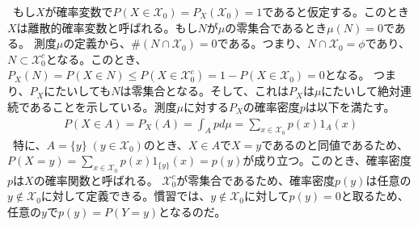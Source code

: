 \documentclass[a4j,12pt]{jarticle}
\begin{document}
\ もし$X$が確率変数で$P(X \in \mathcal{X}_{0}) = P_{X}(\mathcal{X}_{0}) = 1$であると仮定する。このとき$X$は離散的確率変数と呼ばれる。もし$N$が$\mu$の零集合であるとき$\mu(N) = 0$である。
測度$\mu$の定義から、$\#(N \cap \mathcal{X}_{0}) = 0$である。つまり、$N \cap \mathcal{X}_{0} = \phi$であり、$N \subset \mathcal{X}_{0}^{c}$となる。このとき、$P_{X}(N) = P(X \in N) \leq P(X \in \mathcal{X}_{0}^{c}) = 1- P(X \in \mathcal{X}_{0})=0$となる。
つまり、$P_{X}$にたいしても$N$は零集合となる。そして、これは$P_{X}$は$\mu$にたいして絶対連続であることを示している。測度$\mu$に対する$P_{X}$の確率密度$p$は以下を満たす。
\begin{align*}
P(X \in A) = P_{X}(A) = \int_{A}p d\mu = \sum_{x \in \mathcal{X}_{0}}p(x)1_{A}(x)
\end{align*}
\ 特に、$A = \{y\} \; (y \in \mathcal{X}_{0})$のとき、$X \in A$で$X = y$であるのと同値であるため、$P(X = y) = \sum_{x \in \mathcal{X}_{0}}p(x)1_{\{y\}}(x)=p(y)$が成り立つ。このとき、確率密度$p$は$X$の確率関数と呼ばれる。
$\mathcal{X}_{0}^{c}$が零集合であるため、確率密度$p(y)$は任意の$y \notin \mathcal{X}_{0}$に対して定義できる。慣習では、$y \notin \mathcal{X}_{0}$に対して$p(y)=0$と取るため、任意の$y$で$p(y) = P(Y = y)$となるのだ。
\end{document}
